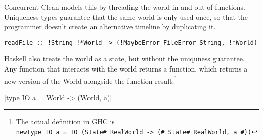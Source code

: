 \documentclass{report}
\begin{document}
Concurrent Clean models this by threading the world in and out of
functions. Uniqueness types guarantee that the same world is only used once, so
that the programmer doesn't create an alternative timeline by duplicating it.
\begin{verbatim}
readFile :: !String !*World -> (!MaybeError FileError String, !*World)
\end{verbatim}
Haskell also treats the world as a state, but without the uniquness guarantee.
Any function that interacts with the world returns a function, which returns a
new version of the World alongside the function result.\footnote{The actual
  definition in GHC is \\ \texttt{newtype IO a = IO (State#
    RealWorld -> (# State# RealWorld, a #))}}

|type IO a = World -> (World, a)|
\end{document}
